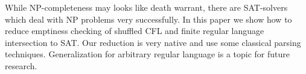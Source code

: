 While NP-completeness may looks like death warrant, there are SAT-solvers which deal with NP problems very successfully.
In this paper we show how to reduce emptiness checking of shuffled CFL and finite regular language intersection to SAT.
Our reduction is very native and use some classical parsing techniques.
Generalization for arbitrary regular language is a topic for future research.
